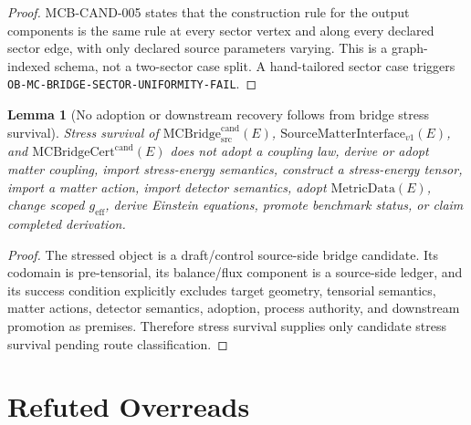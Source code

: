 \documentclass[11pt]{article}
\newcommand{\MetricData}{\mathrm{MetricData}}
\newcommand{\geff}{g_{\mathrm{eff}}}
\newcommand{\MCBridgeCand}{\mathrm{MCBridge}_{\mathrm{src}}^{\mathrm{cand}}}
\newcommand{\MCBridgeCertCand}{\mathrm{MCBridgeCert}^{\mathrm{cand}}}
\newcommand{\SMI}{\mathrm{SourceMatterInterface}_{v1}}
\newtheorem{lemma}{Lemma}
\begin{document}
\begin{proof}
MCB-CAND-005 states that the construction rule for the output components is
the same rule at every sector vertex and along every declared sector edge,
with only declared source parameters varying. This is a graph-indexed schema,
not a two-sector case split. A hand-tailored sector case triggers
\texttt{OB-MC-BRIDGE-SECTOR-UNIFORMITY-FAIL}.
\end{proof}

\begin{lemma}[No adoption or downstream recovery follows from bridge stress survival]
Stress survival of \(\MCBridgeCand(E)\), \(\SMI(E)\), and
\(\MCBridgeCertCand(E)\) does not adopt a coupling law, derive or adopt
matter coupling, import stress-energy semantics, construct a stress-energy
tensor, import a matter action, import detector semantics, adopt
\(\MetricData(E)\), change scoped \(\geff\), derive Einstein equations,
promote benchmark status, or claim completed derivation.
\end{lemma}

\begin{proof}
The stressed object is a draft/control source-side bridge candidate. Its
codomain is pre-tensorial, its balance/flux component is a source-side ledger,
and its success condition explicitly excludes target geometry, tensorial
semantics, matter actions, detector semantics, adoption, process authority,
and downstream promotion as premises. Therefore stress survival supplies only
candidate stress survival pending route classification.
\end{proof}

\section{Refuted Overreads}
\end{document}
